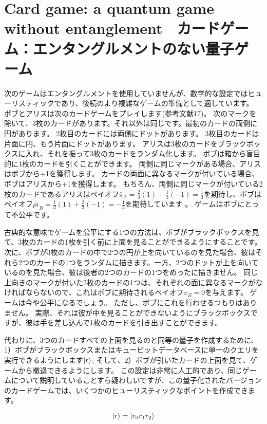 \section{Card game: a quantum game without entanglement　カードゲーム：エンタングルメントのない量子ゲーム}

次のゲームはエンタングルメントを使用していませんが、数学的な設定ではヒューリスティックであり、後続のより複雑なゲームの準備として適しています。 ボブとアリスは次のカードゲームをプレイします(参考文献17)。
次のマークを除いて、3枚のカードがあります。それ以外は同じです。最初のカードの両側に円があります。 2枚目のカードには両側にドットがあります。 3枚目のカードは片面に円、もう片面にドットがあります。 アリスは3枚のカードをブラックボックスに入れ、それを振って3枚のカードをランダム化します。
ボブは箱から盲目的に1枚のカードを引くことができます。 両側に同じマークがある場合、アリスはボブから+1を獲得します。 カードの両面に異なるマークが付いている場合、ボブはアリスから+1を獲得します。 
もちろん、両側に同じマークが付いている2枚のカードであるアリスはペイオフ$ \bar{\pi}_A = \frac{2}{3} (1) + \frac{1}{3}(-1) = \frac{1}{3} $を期待し、ボブはペイオフ$\bar{pi}_B = \frac{1}{3} (1) + \frac{2}{3} (-1) = - \frac{1}{3} $を期待しています 。 ゲームはボブにとって不公平です。

古典的な意味でゲームを公平にする1つの方法は、ボブがブラックボックスを見て、3枚のカードの1枚を引く前に上面を見ることができるようにすることです。
次に、ボブが3枚のカードの中で2つの円が上を向いているのを見た場合、彼はそれら2つのカードの1つをランダムに描きます。一方、2つのドットが上を向いているのを見た場合、彼は後者の2つのカードの1つをめったに描きません。
同じ上向きのマークが付いた2枚のカードの1つは、それぞれの面に異なるマークがなければならないので、これはボブに期待されるペイオフ$\pi_B= 0$を与えます。
ゲームは今や公平になるでしょう。 ただし、ボブにこれを行わせるつもりはありません。 実際、それは彼が中を見ることができないようにブラックボックスですが、彼は手を差し込んで1枚のカードを引き出すことができます。

代わりに、3つのカードすべての上面を見るのと同等の量子を作成するために、1）ボブがブラックボックスまたはキュービットデータベースに単一のクエリを実行できるようにします$\ket{r}$; そして、2）ボブが引いたカードの上面を見て、ゲームから撤退できるようにします。
この設定は非常に人工的であり、同じゲームについて説明していることすら疑わしいですが、この量子化されたバージョンのカードゲームでは、いくつかのヒューリスティックなポイントを作成できます。

\begin{equation}
\label{175}
\ket{r} = \ket{r_0 r_1 r_2}
\end{equation}

